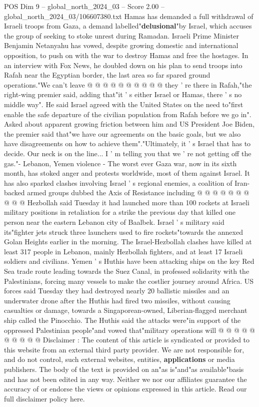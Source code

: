 \begin{textsample}{POS Dim 9 – global\_north\_2024\_03 – Score 2.00 – global\_north\_2024\_03/106607380.txt}
Hamas has demanded a full withdrawal of Israeli troops from Gaza, a demand labelled"\textbf{delusional}"by Israel, which accuses the group of seeking to stoke unrest during Ramadan.
Israeli Prime Minister Benjamin Netanyahu has vowed, despite growing domestic and international opposition, to push on with the war to destroy Hamas and free the hostages.
In an interview with Fox News, he doubled down on his plan to send troops into Rafah near the Egyptian border, the last area so far spared ground operations."We can't leave @ @ @ @ @ @ @ @ @ @ they ' re there in Rafah,"the right-wing premier said, adding that"it ' s either Israel or Hamas, there ' s no middle way".
He said Israel agreed with the United States on the need to"first enable the safe departure of the civilian population from Rafah before we go in".
Asked about apparent growing friction between him and US President Joe Biden, the premier said that"we have our agreements on the basic goals, but we also have disagreements on how to achieve them"."Ultimately, it ' s Israel that has to decide.
Our neck is on the line...
I ' m telling you that we ' re not getting off the gas."- Lebanon, Yemen violence - The worst ever Gaza war, now in its sixth month, has stoked anger and protests worldwide, most of them against Israel.
It has also sparked clashes involving Israel ' s regional enemies, a coalition of Iran-backed armed groups dubbed the Axis of Resistance including @ @ @ @ @ @ @ @ @ @ Hezbollah said Tuesday it had launched more than 100 rockets at Israeli military positions in retaliation for a strike the previous day that killed one person near the eastern Lebanon city of Baalbek.
Israel ' s military said its"fighter jets struck three launchers used to fire rockets"towards the annexed Golan Heights earlier in the morning.
The Israel-Hezbollah clashes have killed at least 317 people in Lebanon, mainly Hezbollah fighters, and at least 17 Israeli soldiers and civilians.
Yemen ' s Huthis have been attacking ships on the key Red Sea trade route leading towards the Suez Canal, in professed solidarity with the Palestinians, forcing many vessels to make the costlier journey around Africa.
US forces said Tuesday they had destroyed nearly 20 ballistic missiles and an underwater drone after the Huthis had fired two missiles, without causing casualties or damage, towards a Singaporean-owned, Liberian-flagged merchant ship called the Pinocchio.
The Huthis said the attacks were"in support of the oppressed Palestinian people"and vowed that"military operations will @ @ @ @ @ @ @ @ @ @ Disclaimer : The content of this article is syndicated or provided to this website from an external third party provider.
We are not responsible for, and do not control, such external websites, entities, \textbf{applications} or media publishers.
The body of the text is provided on an"as is"and"as available"basis and has not been edited in any way.
Neither we nor our affiliates guarantee the accuracy of or endorse the views or opinions expressed in this article.
Read our full disclaimer policy here.

\end{textsample}
